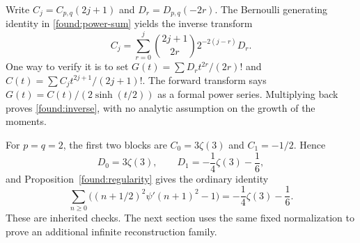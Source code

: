 Write $C_j=C_{p,q}(2j+1)$ and $D_r=D_{p,q}(-2r)$.
The Bernoulli generating identity in \eqref{found:power-sum} yields
the inverse transform
\begin{equation}\label{found:inverse}
 C_j=\sum_{r=0}^j\binom{2j+1}{2r}2^{-2(j-r)}D_r.
\end{equation}
One way to verify it is to set
$G(t)=\sum D_rt^{2r}/(2r)!$ and
$C(t)=\sum C_jt^{2j+1}/(2j+1)!$. The forward transform says
$G(t)=C(t)/(2\sinh(t/2))$ as a formal power series. Multiplying
back proves \eqref{found:inverse}, with no analytic assumption on
the growth of the moments.

For $p=q=2$, the first two blocks are $C_0=3\zeta(3)$ and
$C_1=-1/2$. Hence
\[
 D_0=3\zeta(3),\qquad
 D_1=-\frac14\zeta(3)-\frac16,
\]
and Proposition~\ref{found:regularity} gives the ordinary identity
\[
 \sum_{n\ge0}\bigl((n+1/2)^2\psi'(n+1)^2-1\bigr)
 =-\frac14\zeta(3)-\frac16.
\]
These are inherited checks. The next section uses the same fixed
normalization to prove an additional infinite reconstruction family.
